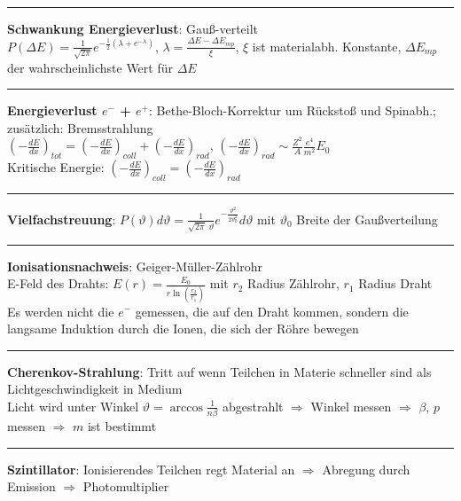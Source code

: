 \documentclass[10pt,twoside,a4paper]{article}
\begin{document}
\begin{multicols*}{3}
\\ \rule[0ex]{\columnwidth}{0.5pt}
\textbf{Schwankung Energieverlust}: Gauß-verteilt \\
$P(\Delta E) = \frac{1}{\sqrt{2 \pi}} e^{-\frac{1}{2}\left( \lambda + e^{-\lambda} \right)}$, $\lambda = \frac{\Delta E - {\Delta E}_{mp}}{\xi}$, $\xi$ ist materialabh. Konstante, ${\Delta E}_{mp}$ der wahrscheinlichste Wert für $\Delta E$
\\ \rule[0ex]{\columnwidth}{0.5pt}
\textbf{Energieverlust $e^-$ + $e^+$}: Bethe-Bloch-Korrektur um Rückstoß und Spinabh.; zusätzlich: Bremsstrahlung \\
$\left( - \frac{dE}{dx} \right)_{tot} = \left( - \frac{dE}{dx} \right)_{coll} + \left( - \frac{dE}{dx} \right)_{rad}$, $\left( - \frac{dE}{dx} \right)_{rad} \sim \frac{Z^2}{A} \frac{e^4}{m^2} E_0$ \\
Kritische Energie: $\left( - \frac{dE}{dx} \right)_{coll} = \left( - \frac{dE}{dx} \right)_{rad}$
\\ \rule[0ex]{\columnwidth}{0.5pt}
\textbf{Vielfachstreuung}: $P(\vartheta) d\vartheta = \frac{1}{\sqrt{2 \pi} \; \vartheta} e^{-\frac{\vartheta^2}{2 \vartheta^2_0}} d\vartheta$ mit $\vartheta_0$ Breite der Gaußverteilung
\\ \rule[0ex]{\columnwidth}{0.5pt}
\textbf{Ionisationsnachweis}: Geiger-Müller-Zählrohr \\
E-Feld des Drahts: $E(r) = \frac{E_0}{r \ln \left( \frac{r_2}{r_1} \right)}$ mit $r_2$ Radius Zählrohr, $r_1$ Radius Draht \\
Es werden nicht die $e^-$ gemessen, die auf den Draht kommen, sondern die langsame Induktion durch die Ionen, die sich der Röhre bewegen
\\ \rule[0ex]{\columnwidth}{0.5pt}
\textbf{Cherenkov-Strahlung}: Tritt auf wenn Teilchen in Materie schneller sind als Lichtgeschwindigkeit in Medium \\
Licht wird unter Winkel $\vartheta = \arccos \frac{1}{n \beta}$ abgestrahlt $\Rightarrow$ Winkel messen $\Rightarrow$ $\beta$, $p$ messen $\Rightarrow$ $m$ ist bestimmt
\\ \rule[0ex]{\columnwidth}{0.5pt}
\textbf{Szintillator}: Ionisierendes Teilchen regt Material an $\Rightarrow$ Abregung durch Emission $\Rightarrow$ Photomultiplier \\

\end{multicols*}
\end{document}

